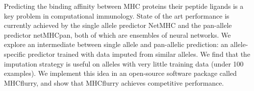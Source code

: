 Predicting the binding affinity between MHC proteins their peptide ligands is a key problem in computational immunology. State of the art performance is currently achieved by the single allele predictor NetMHC and the pan-allele predictor netMHCpan, both of which are ensembles of neural networks. We explore an intermediate between single allele and pan-allelic prediction: an allele-specific predictor trained with data imputed from similar alleles. We find that the imputation strategy is useful on alleles with very little training data (under 100 examples). We implement this idea in an open-source software package called MHCflurry, and show that MHCflurry achieves competitive performance.